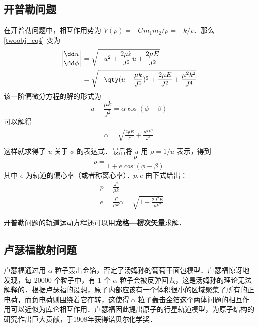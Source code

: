 \subsection{开普勒问题}
在开普勒问题中，相互作用势为 $V(\rho)=-Gm_1m_2/\rho=-k/\rho$．那么 \autoref{twoobj_eq4} 变为
\begin{equation}
\begin{aligned}
\left|\frac{\dd u}{\dd \phi}\right|&=\sqrt{-u^2+\frac{2\mu k}{J^2}u+\frac{2\mu E}{J^2}}\\
&=\sqrt{-\qty(u-\frac{\mu k}{J^2})^2+\frac{2\mu E}{J^2}+\frac{\mu^2 k^2}{J^4}}
\end{aligned}
\end{equation}
该一阶偏微分方程的解的形式为
\begin{equation}
u-\frac{\mu k}{J^2}=\alpha\cos(\phi-\beta)
\end{equation}
可以解得
\begin{equation}
\begin{aligned}
\alpha=\sqrt{\frac{2\mu E}{J^2}+\frac{\mu^2 k^2}{J^4}}\\
\end{aligned}
\end{equation}
这样就求得了 $u$ 关于 $\phi$ 的表达式．最后将 $u$ 用 $\rho=1/u$ 表示，得到
\begin{equation}
\rho=\frac{p}{1+e\cos(\phi-\beta)}
\end{equation}
其中 $e$ 为轨道的偏心率（或者称离心率）．$p,e$ 由下式给出：
\begin{equation}
\begin{aligned}
&p=\frac{J^2}{\mu k}\\
&e=\frac{J^2}{\mu k}\alpha=\sqrt{1+\frac{2J^2E}{\mu k^2}}
\end{aligned}
\end{equation}

开普勒问题的轨道运动方程还可以用\textbf{龙格—楞次矢量}求解．

\subsection{卢瑟福散射问题}
卢瑟福通过用 $\alpha$ 粒子轰击金箔，否定了汤姆孙的葡萄干面包模型．卢瑟福惊讶地发现，每 20000 个粒子中，有 1 个 $\alpha$ 粒子会被反弹回去，这是汤姆孙的理论无法解释的．根据卢瑟福的设想，原子内部应该有一个体积很小的区域聚集了所有的正电荷，而负电荷则围绕着它在转，这使得 $\alpha$ 粒子轰击金箔这个两体问题的相互作用可以近似为库仑相互作用．卢瑟福因此提出原子的行星轨道模型，为原子结构的研究作出巨大贡献，于1908年获得诺贝尔化学奖．

